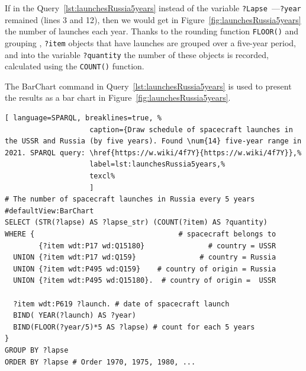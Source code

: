 If in the Query~\ref{lst:launchesRussia5years} instead of the variable \lstinline|?Lapse|~---\lstinline|?year| remained (lines 3 and 12),
then we would get in Figure~\ref{fig:launchesRussia5years}
the number of launches each year.
Thanks to the rounding function \lstinline|FLOOR()|
and grouping%
,
\lstinline|?item| objects that have launches are grouped over a five-year period,
and into the variable \lstinline|?quantity| the number of these objects is recorded,
calculated using the \lstinline|COUNT()| function.

The BarChart command in Query~\ref{lst:launchesRussia5years} is used to present the results as a bar chart in Figure~\ref{fig:launchesRussia5years}.

\begin{lstlisting}[ language=SPARQL, breaklines=true, %
                    caption={Draw schedule of spacecraft launches in the USSR and Russia (by five years). Found \num{14} five-year range in 2021. SPARQL query: \href{https://w.wiki/4f7Y}{https://w.wiki/4f7Y}},%
                    label=lst:launchesRussia5years,%
                    texcl%
                    ]
# The number of spacecraft launches in Russia every 5 years
#defaultView:BarChart
SELECT (STR(?lapse) AS ?lapse_str) (COUNT(?item) AS ?quantity)
WHERE {                                  # spacecraft belongs to
        {?item wdt:P17 wd:Q15180}               # country = USSR
  UNION {?item wdt:P17 wd:Q159}               # country = Russia
  UNION {?item wdt:P495 wd:Q159}    # country of origin = Russia
  UNION {?item wdt:P495 wd:Q15180}.  # country of origin =  USSR
  
  ?item wdt:P619 ?launch. # date of spacecraft launch
  BIND( YEAR(?launch) AS ?year) 
  BIND(FLOOR(?year/5)*5 AS ?lapse) # count for each 5 years
} 
GROUP BY ?lapse
ORDER BY ?lapse # Order 1970, 1975, 1980, ...
\end{lstlisting}%

